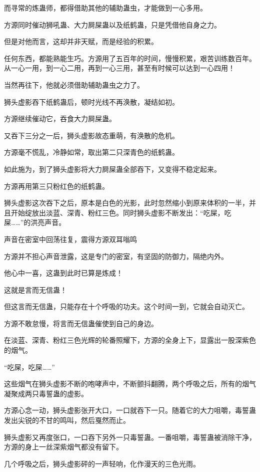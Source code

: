 \begin{this_body}
而寻常的炼蛊师，都得借助其他的辅助蛊虫，才能做到一心多用。

方源同时催动狮吼蛊、大力屙屎蛊以及纸鹤蛊，只是凭借他自身之力。

但是对他而言，这却并非天赋，而是经验的积累。

任何东西，都能熟能生巧。方源用了五百年的时间，慢慢积累，艰苦训练数百年。从一心一用，到一心二用，再到一心三用，甚至有时候可以达到一心四用！

当然再往下，他就必须借助辅助蛊虫之力了。

狮头虚影吞下纸鹤蛊后，顿时光线不再涣散，凝结如初。

方源继续催动它，吞食大力屙屎蛊。

又吞下三分之一后，狮头虚影故态重萌，有涣散的危机。

方源毫不慌乱，冷静如常，取出第二只深青色的纸鹤蛊。

如此施为，到了狮头虚影将大力屙屎蛊全部吞下，又变得不稳定起来。

方源再用第三只粉红色的纸鹤蛊。

狮头虚影这次吞下之后，原本是白色的光影，此时忽然缩小到原来体积的一半，并且开始绽放出淡蓝、深青、粉红三色。同时狮头虚影不断发出：“吃屎，吃屎……”的洪亮声音。

声音在密室中回荡往复，震得方源双耳嗡鸣

方源并不担心声音泄露，这是专门的密室，有坚固的防御力，隔绝内外。

他心中一喜，这蛊到此时已算是炼成！

这就是言而无信蛊！

但这言而无信蛊，只能存在十个呼吸的功夫。这个时间一到，它就会自动灭亡。

方源不敢怠慢，将言而无信蛊催使到自己的身边。

在淡蓝、深青、粉红三色光辉的轮番照耀下，方源的全身上下，显露出一股深紫色的烟气。

“吃屎，吃屎……”

这些烟气在狮头虚影不断的咆哮声中，不断颤抖翻腾，两个呼吸之后，所有的烟气凝聚成两只毒誓蛊的虚影。

方源心念一动，狮头虚影张开大口，一口就吞下一只。随着它的大力咀嚼，毒誓蛊发出尖锐的不甘的鸣叫，然后戛然而止。

狮头虚影又再度张口，一口吞下另外一只毒誓蛊。一番咀嚼，毒誓蛊被消除干净，方源的身上一丝深紫烟气都没有留下。

几个呼吸之后，狮头虚影砰的一声轻响，化作漫天的三色光雨。


\end{this_body}
